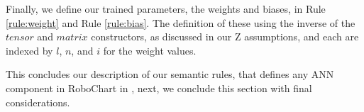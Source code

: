 Finally, we define our trained parameters, the weights and biases, in Rule \ref{rule:weight} and Rule \ref{rule:bias}. The definition of these using the inverse of the $tensor$ and $matrix$ constructors, as discussed in our Z assumptions, and each are indexed by $l$, $n$, and $i$ for the weight values. 

This concludes our description of our semantic rules, that defines any ANN component in RoboChart in \Circus, next, we conclude this section with final considerations.